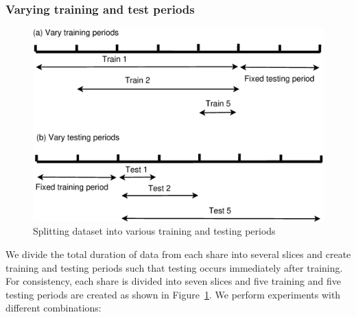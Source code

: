
\subsubsection{Varying training and test periods} 
\label{sec:varytraintest} 
\begin{figure}[!htbp]
\begin{center}
\centering
\includegraphics[width=0.75\linewidth]{FileAccess/figs/traintestsplits}
\caption{Splitting dataset into various training and testing periods
} 
\label{fig:traintestsplits}
\end{center}
\end{figure}
We divide the total duration of data from each share into several
slices and create training and testing periods such that testing
occurs immediately after training. For consistency, each share is
divided into seven slices and five training and five testing periods
are created as shown in Figure~\ref{fig:traintestsplits}.
We perform experiments with different combinations:
